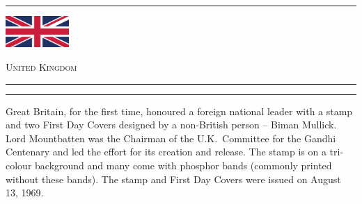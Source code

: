 \documentclass[a4paper]{article}
\begin{document}
\hrule
\vspace{8pt}
\begin{minipage}{3cm}
  \includegraphics[height=1.2cm]{images/gb}
\end{minipage}
\hfill
{\scshape\huge United Kingdom}
\vspace{8pt}
\hrule
\vspace{14cm}
\hfill
\begin{minipage}{5.2cm} \hrule \vspace{12pt} Great Britain, for the
  first time, honoured a foreign national leader with a stamp and two
  First Day Covers designed by a non-British person -- Biman
  Mullick. Lord Mountbatten was the Chairman of the U.K.\ Committee
  for the Gandhi Centenary and led the effort for its creation and
  release. The stamp is on a tri-colour background and many come with
  phosphor bands (commonly printed without these bands). The stamp and
  First Day Covers were issued on August 13, 1969.
\end{minipage}
\end{document}
